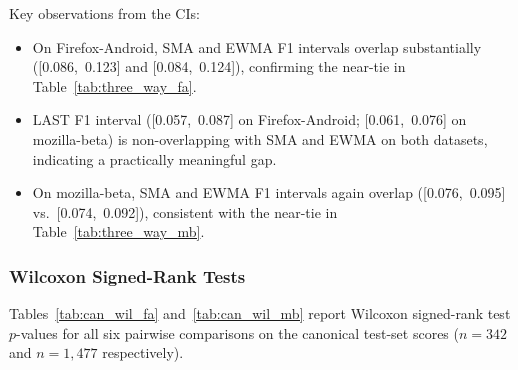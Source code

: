 \documentclass[a4paper,fleqn]{cas-sc}
\theoremstyle{plain}
\begin{document}
Key observations from the CIs:
\begin{itemize}
  \item On Firefox-Android, SMA and EWMA F1 intervals overlap substantially
    ([0.086,~0.123] and [0.084,~0.124]), confirming the near-tie in
    Table~\ref{tab:three_way_fa}.
  \item LAST F1 interval ([0.057,~0.087] on Firefox-Android;
    [0.061,~0.076] on mozilla-beta) is non-overlapping with SMA and EWMA
    on both datasets, indicating a practically meaningful gap.
  \item On mozilla-beta, SMA and EWMA F1 intervals again overlap
    ([0.076,~0.095] vs.\ [0.074,~0.092]), consistent with the
    near-tie in Table~\ref{tab:three_way_mb}.
\end{itemize}

\subsubsection{Wilcoxon Signed-Rank Tests}

Tables~\ref{tab:can_wil_fa} and~\ref{tab:can_wil_mb} report Wilcoxon
signed-rank test $p$-values for all six pairwise comparisons on the
canonical test-set scores ($n=342$ and $n=1{,}477$ respectively).

\begin{table}[tbp]
\centering
{}
\caption{Wilcoxon signed-rank $p$-values on the canonical
  60\%/20\%/20\% test set, Firefox-Android ($n=342$ signatures).}
\label{tab:can_wil_fa}
\end{table}
\end{document}
